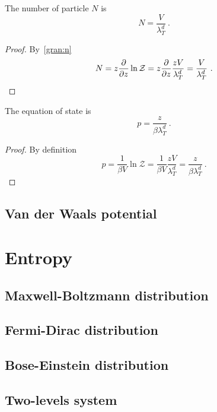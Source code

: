     The number of particle $N$ is 
    \begin{equation*}
        N = \frac{V}{\lambda_T^d} ~.
    \end{equation*}
    \begin{proof}
        By~\eqref{gran:n}
        \begin{equation*}
            N = z \frac{\partial}{\partial z} \ln \mathcal Z = z \frac{\partial}{\partial z} \frac{z V}{\lambda_T^d} = \frac{V}{\lambda_T^d} ~.
        \end{equation*}
    \end{proof}
    
    The equation of state is 
    \begin{equation*}
        p = \frac{z}{\beta \lambda_T^d} ~.
    \end{equation*}
    \begin{proof}
        By definition
        \begin{equation*}
            p = \frac{1}{\beta V} \ln \mathcal Z = \frac{1}{\beta V} \frac{z V}{\lambda_T^d} = \frac{z}{\beta \lambda_T^d} ~.
        \end{equation*}
    \end{proof}

\section{Van der Waals potential}

\chapter{Entropy}

\section{Maxwell-Boltzmann distribution}

\section{Fermi-Dirac distribution}

\section{Bose-Einstein distribution}

\section{Two-levels system}

